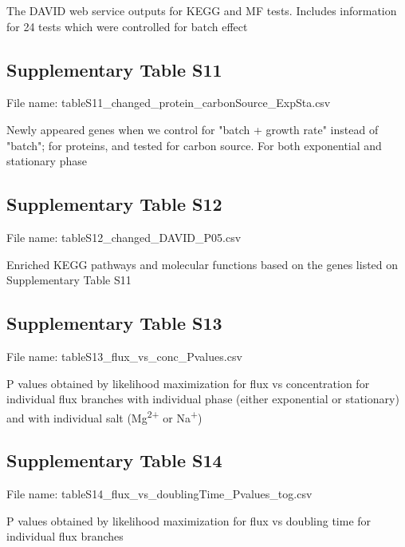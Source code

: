 \documentclass[a4paper]{article}
\begin{document}
The DAVID web service outputs for KEGG and MF tests. Includes information for 24 tests which were controlled for batch effect

\subsection*{Supplementary Table S11}
File name: tableS11\_changed\_protein\_carbonSource\_ExpSta.csv

Newly appeared genes when we control for "batch + growth rate" instead of "batch"; for proteins, and tested for carbon source. For both exponential and stationary phase

\subsection*{Supplementary Table S12}
File name: tableS12\_changed\_DAVID\_P05.csv

Enriched KEGG pathways and molecular functions based on the genes listed on Supplementary Table S11

\subsection*{Supplementary Table S13}
File name: tableS13\_flux\_vs\_conc\_Pvalues.csv

P values obtained by likelihood maximization for flux vs concentration for individual flux branches with individual phase (either exponential or stationary) and with individual salt (Mg\textsuperscript{2+} or Na\textsuperscript{+}) 

\subsection*{Supplementary Table S14}
File name: tableS14\_flux\_vs\_doublingTime\_Pvalues\_tog.csv

P values obtained by likelihood maximization for flux vs doubling time for individual flux branches
\end{document}
